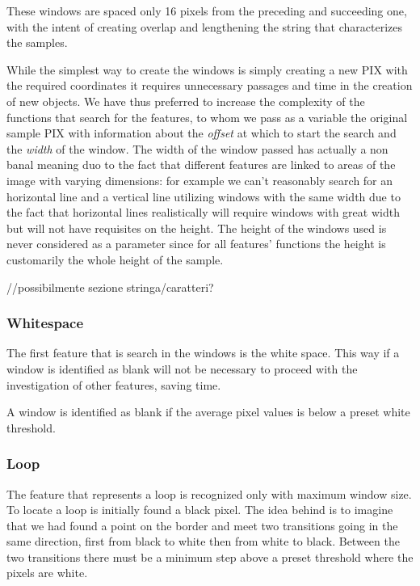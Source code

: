 These windows are spaced only 16 pixels from the preceding and succeeding one, with the intent of creating overlap and lengthening the string that characterizes the samples.

While the simplest way to create the windows is simply creating a new PIX with the required coordinates it requires unnecessary passages and time in the creation of new objects. We have thus preferred to increase the complexity of the functions that search for the features, to whom we pass as a variable the original sample PIX with information about the \textit{offset} at which to start the search and the \textit{width} of the window. The width of the window passed has actually a non banal meaning duo to the fact that different features are linked to areas of the image with varying dimensions: for example we can't reasonably search for an horizontal line and a vertical line utilizing windows with the same width due to the fact that horizontal lines realistically will require windows with great width but will not have requisites on the height.
The height of the windows used is never considered as a parameter since for all features' functions the height is customarily the whole height of the sample.  


//possibilmente sezione stringa/caratteri?

\subsubsection{Whitespace}  

The first feature that is search in the windows is the white space. This way if a window is identified as blank will not be necessary to proceed with the investigation of other features, saving time.

A window is identified as blank if the average pixel values is below a preset white threshold.

\subsubsection{Loop}

The feature that represents a loop is recognized only with maximum window size.
To locate a loop is initially found a black pixel. The idea behind is to imagine that we had found a point on the border and meet two transitions going in the same direction, first from black to white then from white to black. Between the two transitions there must be a minimum step above a preset threshold where the pixels are white.

